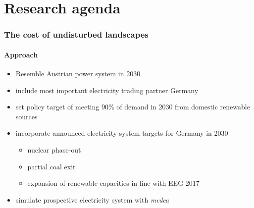\documentclass[aspectratio=169, xcolor=dvipsnames]{beamer}
\begin{document}
\section{Research agenda}
\begin{frame}
\frametitle{The cost of undisturbed landscapes}
\framesubtitle{Approach}
\begin{itemize}
\item Resemble Austrian power system in 2030
\item include most important electricity trading partner Germany
\item set policy target of meeting $90\%$ of demand in 2030 from domestic renewable sources
\item incorporate announced electricity system targets for Germany in 2030
	\begin{itemize}
	\item nuclear phase-out
	\item partial coal exit
	\item expansion of renewable capacities in line with EEG 2017
	\end{itemize}
\item simulate prospective electricity system with \emph{medea}
\end{itemize}
\end{frame}
\end{document}
